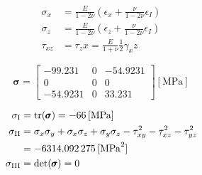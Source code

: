 \begin{align*}
	\sigma_x &= \frac{E}{1-2\nu}\left(\epsilon_x + \frac{\nu}{1-2\nu} \epsilon_I\right) \\
	\sigma_z &= \frac{E}{1-2\nu}\left(\epsilon_z + \frac{\nu}{1-2\nu} \epsilon_I\right) \\
	\tau_{xz} &= \tau_zx = \frac{E}{1+\nu} \frac{1}{2}\gamma_xz
\end{align*}

\begin{equation*}
	\pmb{\sigma} = \begin{bmatrix}
		-99.231 & 0 & -54.9231 \\
		0 & 0 & 0 \\
		-54.9231 & 0 & 33.231
	\end{bmatrix} \left[\si{\mega\pascal}\right]
\end{equation*}

\begin{align*}
	\sigma_\text{I} &= \text{tr}(\pmb{\sigma}) = \SI{-66}{[\mega\pascal]} \\
	\sigma_\text{II} &= \sigma_x \sigma_y + \sigma_x \sigma_z + \sigma_y \sigma_z - \tau_{xy}^2 - \tau_{xz}^2 - \tau_{yz}^2 \\&= \SI{-6314.092275}{[\mega\pascal^2]}\\
	\sigma_\text{III} &= \text{det}(\pmb{\sigma}) = 0
\end{align*}
